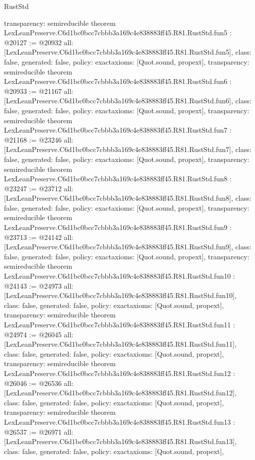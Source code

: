 \begin{lexlean}{RustStd}
\begin{coremodule}
{  transparency: semireducible
}
theorem LexLeanPreserve.C6d1bc0bcc7cbbb3a169c4e838883ff45.R81.RustStd.fun5 : @20127 := @20932 {
  all: [LexLeanPreserve.C6d1bc0bcc7cbbb3a169c4e838883ff45.R81.RustStd.fun5],
  class: false,
  generated: false,
  policy: exact{axioms: [Quot.sound, propext]},
  transparency: semireducible
}
theorem LexLeanPreserve.C6d1bc0bcc7cbbb3a169c4e838883ff45.R81.RustStd.fun6 : @20933 := @21167 {
  all: [LexLeanPreserve.C6d1bc0bcc7cbbb3a169c4e838883ff45.R81.RustStd.fun6],
  class: false,
  generated: false,
  policy: exact{axioms: [Quot.sound, propext]},
  transparency: semireducible
}
theorem LexLeanPreserve.C6d1bc0bcc7cbbb3a169c4e838883ff45.R81.RustStd.fun7 : @21168 := @23246 {
  all: [LexLeanPreserve.C6d1bc0bcc7cbbb3a169c4e838883ff45.R81.RustStd.fun7],
  class: false,
  generated: false,
  policy: exact{axioms: [Quot.sound, propext]},
  transparency: semireducible
}
theorem LexLeanPreserve.C6d1bc0bcc7cbbb3a169c4e838883ff45.R81.RustStd.fun8 : @23247 := @23712 {
  all: [LexLeanPreserve.C6d1bc0bcc7cbbb3a169c4e838883ff45.R81.RustStd.fun8],
  class: false,
  generated: false,
  policy: exact{axioms: [Quot.sound, propext]},
  transparency: semireducible
}
theorem LexLeanPreserve.C6d1bc0bcc7cbbb3a169c4e838883ff45.R81.RustStd.fun9 : @23713 := @24142 {
  all: [LexLeanPreserve.C6d1bc0bcc7cbbb3a169c4e838883ff45.R81.RustStd.fun9],
  class: false,
  generated: false,
  policy: exact{axioms: [Quot.sound, propext]},
  transparency: semireducible
}
theorem LexLeanPreserve.C6d1bc0bcc7cbbb3a169c4e838883ff45.R81.RustStd.fun10 : @24143 := @24973 {
  all: [LexLeanPreserve.C6d1bc0bcc7cbbb3a169c4e838883ff45.R81.RustStd.fun10],
  class: false,
  generated: false,
  policy: exact{axioms: [Quot.sound, propext]},
  transparency: semireducible
}
theorem LexLeanPreserve.C6d1bc0bcc7cbbb3a169c4e838883ff45.R81.RustStd.fun11 : @24974 := @26045 {
  all: [LexLeanPreserve.C6d1bc0bcc7cbbb3a169c4e838883ff45.R81.RustStd.fun11],
  class: false,
  generated: false,
  policy: exact{axioms: [Quot.sound, propext]},
  transparency: semireducible
}
theorem LexLeanPreserve.C6d1bc0bcc7cbbb3a169c4e838883ff45.R81.RustStd.fun12 : @26046 := @26536 {
  all: [LexLeanPreserve.C6d1bc0bcc7cbbb3a169c4e838883ff45.R81.RustStd.fun12],
  class: false,
  generated: false,
  policy: exact{axioms: [Quot.sound, propext]},
  transparency: semireducible
}
theorem LexLeanPreserve.C6d1bc0bcc7cbbb3a169c4e838883ff45.R81.RustStd.fun13 : @26537 := @26971 {
  all: [LexLeanPreserve.C6d1bc0bcc7cbbb3a169c4e838883ff45.R81.RustStd.fun13],
  class: false,
  generated: false,
  policy: exact{axioms: [Quot.sound, propext]},
}
\end{coremodule}
\end{lexlean}
